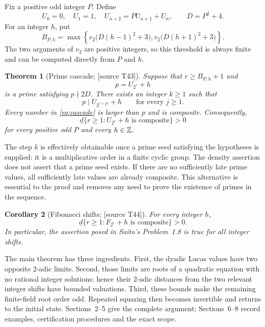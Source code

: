 \documentclass[11pt,a4paper]{article}
\newtheorem{theorem}{Theorem}[section]
\newtheorem{corollary}[theorem]{Corollary}
\theoremstyle{definition}\newtheorem{definition}[theorem]{Definition}
\theoremstyle{remark}\newtheorem{remark}[theorem]{Remark}
\newcommand{\sourceT}[1]{\textup{[source T#1]}}
\begin{document}
Fix a positive odd integer $P$. Define
\begin{equation}\label{eq:Udef}
 U_0=0,\quad U_1=1,\quad U_{n+2}=PU_{n+1}+U_n,
 \qquad D=P^2+4.
\end{equation}
For an integer $h$, put
\begin{equation}\label{eq:Bdef}
 B_{P,h}=\max\left\{
 v_2\bigl(D(h-1)^2+3\bigr),
 v_2\bigl(D(h+1)^2+3\bigr)\right\}.
\end{equation}
The two arguments of $v_2$ are positive integers, so this threshold is
always finite and can be computed directly from $P$ and $h$.

\begin{theorem}[Prime cascade; \sourceT{43}]\label{thm:cascade}
Suppose that $r\ge B_{P,h}+1$ and
\[
 p=U_{2^r}+h
\]
is a prime satisfying $p\nmid2D$. There exists an integer $k\ge1$ such
that
\begin{equation}\label{eq:cascade}
 p\mid U_{2^{r+jk}}+h\qquad\text{for every }j\ge1.
\end{equation}
Every number in \eqref{eq:cascade} is larger than $p$ and is composite.
Consequently,
\begin{equation}\label{eq:density}
 \underline d\{r\ge1:U_{2^r}+h\text{ is composite}\}>0
\end{equation}
for every positive odd $P$ and every $h\in\mathbb Z$.
\end{theorem}

The step $k$ is effectively obtainable once a prime seed satisfying the
hypotheses is supplied: it is a multiplicative order in a finite cyclic
group. The density assertion does not assert that a prime seed exists.
If there are no sufficiently late prime values, all sufficiently late
values are already composite. This alternative is essential to the
proof and removes any need to prove the existence of primes in the
sequence.

\begin{corollary}[Fibonacci shifts; \sourceT{44}]\label{cor:Fib}
For every integer $h$,
\[
 \underline d\{r\ge1:F_{2^r}+h\text{ is composite}\}>0.
\]
In particular, the assertion posed in Saito's Problem~1.8 is true for
all integer shifts.
\end{corollary}

The main theorem has three ingredients. First, the dyadic Lucas values
have two opposite 2-adic limits. Second, those limits are roots of a
quadratic equation with no rational integer solutions; hence their
2-adic distances from the two relevant integer shifts have bounded
valuations. Third, these bounds make the remaining finite-field root
order odd. Repeated squaring then becomes invertible and returns to the
initial state. Sections~2--5 give the complete argument; Sections~6--8
record examples, certification procedures and the exact scope.
\end{document}
